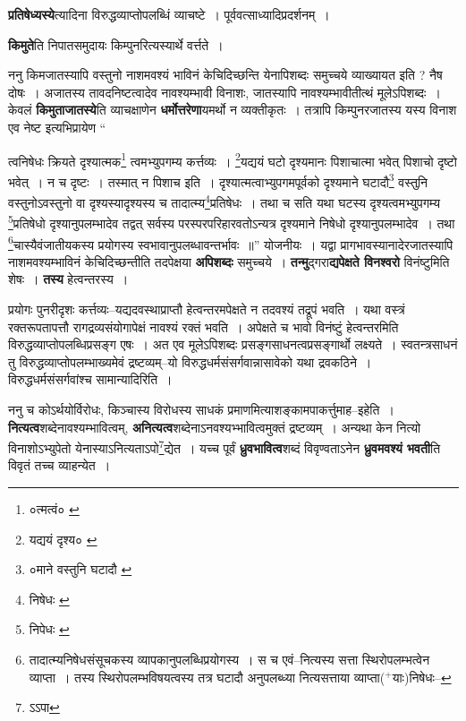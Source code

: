 \documentclass[article,12pt,a4paper]{memoir}
\newcommand{\add}[1]{($^{+}$#1)}
\begin{document}
	  \pstart \textbf{प्रतिषेध्यस्ये}त्यादिना विरुद्धव्याप्तोपलब्धिं\leavevmode{} व्याचष्टे । पूर्ववत्साध्यादिप्रदर्शनम् ।
	\pend
      

	  \pstart \textbf{किमुते}ति निपातसमुदायः किम्पुनरित्यस्यार्थे वर्त्तते ।
	\pend
      

	  \pstart ननु किमजातस्यापि वस्तुनो नाशमवश्यं भाविनं केचिदिच्छन्ति येनापिशब्दः समुच्चये व्याख्यायत इति ? नैष दोषः । अजातस्य तावदनिष्टत्वादेव नावश्यम्भावी विनाशः, जातस्यापि नावश्यम्भावीतीत्थं मूलेऽपिशब्दः । केवलं \textbf{किमुताजातस्ये}ति व्याचक्षाणेन \textbf{धर्मोत्तरेणा}यमर्थो न व्यक्तीकृतः । तत्रापि किम्पुनरजातस्य यस्य विनाश एव नेष्ट इत्यभिप्रायेण  \leavevmode{} “
	  
	त्वनिषेधः क्रियते दृश्यात्मक\footnote{०त्मत्वं० \cite{dp-msA} \cite{dp-edP} \cite{dp-edH} \cite{dp-edE} \cite{dp-edN}} त्वमभ्युपगम्य कर्त्तव्यः । \footnote{यद्ययं दृश्य० \cite{dp-msA} \cite{dp-edP} \cite{dp-edH} \cite{dp-edE} \cite{dp-edN}}यद्ययं घटो दृश्यमानः पिशाचात्मा भवेत् पिशाचो दृष्टो भवेत् । न च दृष्टः । तस्मात् न पिशाच इति । दृश्यात्मत्वाभ्युपगमपूर्वको दृश्यमाने घटादौ\footnote{०माने वस्तुनि घटादौ \cite{dp-msC}} वस्तुनि वस्तुनोऽवस्तुनो वा दृश्यस्यादृश्यस्य च तादात्म्य\footnote{निषेधः \cite{dp-msA} \cite{dp-msB} \cite{dp-edP} \cite{dp-edH} \cite{dp-edE} \cite{dp-edN}}प्रतिषेधः । तथा च सति यथा घटस्य दृश्यत्वमभ्युपगम्य \footnote{निपेधः \cite{dp-msB}}प्रतिषेधो दृश्यानुपलम्भादेव तद्वत् सर्वस्य परस्परपरिहारवतोऽन्यत्र दृश्यमाने निषेधो दृश्यानुपलम्भादेव । तथा \footnote{तादात्म्यनिषेधसंसूचकस्य व्यापकानुपलब्धिप्रयोगस्य । स च एवं--नित्यस्य सत्ता स्थिरोपलम्भत्वेन व्याप्ता । तस्य स्थिरोपलम्भविषयत्वस्य तत्र घटादौ अनुपलब्ध्या नित्यसत्ताया व्याप्ता\add{याः}निषेधः--\cite{dp-msD-n}}चास्यैवंजातीयकस्य प्रयोगस्य स्वभावानुपलब्धावन्तर्भावः ॥” योजनीयः । यद्वा प्रागभावस्यानादेरजातस्यापि नाशमवश्यम्भाविनं केचिदिच्छन्तीति तदपेक्षया \textbf{अपिशब्दः} समुच्चये । \textbf{तन्मु}द्गरा\textbf{द्यपेक्षते विनश्वरो} विनंष्टुमिति शेषः । \textbf{तस्य} हेत्वन्तरस्य ।
	\pend
      

	  \pstart प्रयोगः पुनरीदृशः कर्त्तव्यः--यद्यदवस्थाप्राप्तौ हेत्वन्तरमपेक्षते न तदवश्यं तद्रूपं भवति । यथा वस्त्रं रक्तरूपतापत्तौ रागद्रव्यसंयोगापेक्षं नावश्यं रक्तं भवति । अपेक्षते च भावो विनंष्टुं हेत्वन्तरमिति विरुद्धव्याप्तोपलब्धिप्रसङ्ग एषः । अत एव मूलेऽपिशब्दः प्रसङ्गसाधनत्वप्रसङ्गार्थो लक्ष्यते । स्वतन्त्रसाधनं तु विरुद्धव्याप्तोपलम्भाख्यमेवं द्रष्टव्यम्--यो विरुद्धधर्मसंसर्गवान्नासावेको यथा द्रवकठिने । विरुद्धधर्मसंसर्गवांश्च सामान्यादिरिति ।
	\pend
      

	  \pstart ननु च कोऽर्थयोर्विरोधः, किञ्चास्य विरोधस्य साधकं प्रमाणमित्याशङ्कामपाकर्त्तुमाह--इहेति । \textbf{नित्यत्व}शब्देनावश्यम्भावित्वम्, \textbf{अनित्यत्व}शब्देनाऽनवश्यभ्भावित्वमुक्तं द्रष्टव्यम् । अन्यथा केन नित्यो विनाशोऽभ्युपेतो येनास्याऽनित्यताऽपो\footnote{ऽऽपा}द्येत । यच्च पूर्वं \textbf{ध्रुवभावित्व}शब्दं विवृण्वताऽनेन \textbf{ध्रुवमवश्यं भवती}ति विवृतं तच्च व्याहन्येत ।
	\pend
      
\end{document}
